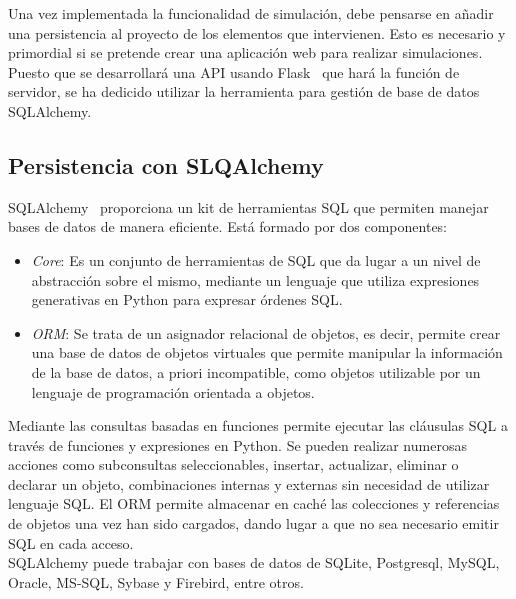 Una vez implementada la funcionalidad de simulación, debe pensarse en añadir una persistencia al proyecto de los elementos que intervienen. Esto es necesario y primordial si se pretende crear una aplicación web para realizar simulaciones. Puesto que se desarrollará una API usando Flask~\cite{Flask} que hará la función de servidor, se ha dedicido utilizar la herramienta para gestión de base de datos SQLAlchemy.
\subsection{Persistencia con SLQAlchemy}
SQLAlchemy~\cite{SqlAl} proporciona un kit de herramientas SQL que permiten manejar bases de datos de manera eficiente. Está formado por dos componentes:
\begin{itemize}
\item \textit{Core}: Es un conjunto de herramientas de SQL que da lugar a un nivel de abstracción sobre el mismo, mediante un lenguaje que utiliza expresiones generativas en Python para expresar órdenes SQL.
\item \textit{ORM}: Se trata de un asignador relacional de objetos, es decir, permite crear una base de datos de objetos virtuales que permite manipular la información de la base de datos, a priori incompatible, como objetos utilizable por un lenguaje de programación orientada a objetos.
\end{itemize}
Mediante las consultas basadas en funciones permite ejecutar las cláusulas SQL a través de funciones y expresiones en Python. Se pueden realizar numerosas acciones como subconsultas seleccionables, insertar, actualizar, eliminar o declarar un objeto, combinaciones internas y externas sin necesidad de utilizar lenguaje SQL. El ORM permite almacenar en caché las colecciones y referencias de objetos una vez han sido cargados, dando lugar a que no sea necesario emitir SQL en cada acceso.\\

SQLAlchemy puede trabajar con bases de datos de SQLite, Postgresql, MySQL, Oracle, MS-SQL, Sybase y Firebird, entre otros.
